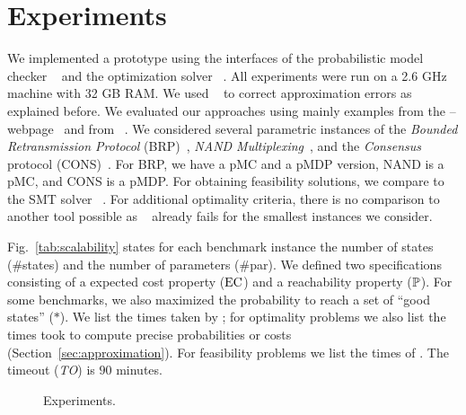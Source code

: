 \section{Experiments}\label{sec:experiments}
%
We implemented a prototype using the  interfaces of the probabilistic model checker ~\cite{DBLP:journals/corr/DehnertJK016} and the optimization solver ~\cite{mosek}.
 All experiments were run on a 2.6 GHz machine with 32 GB RAM. 
 We used ~\cite{KNP11} to correct approximation errors as explained before. 
%
We evaluated our approaches using mainly examples from the --webpage~\cite{param_website} and from ~\cite{KNP12b}.
We considered several parametric instances of the \emph{Bounded Retransmission Protocol} (BRP)~\cite{HSV94},  \emph{NAND Multiplexing}~\cite{HJ02}, and the \emph{Consensus} protocol (CONS)~\cite{consensus}. For BRP, we have a pMC and a pMDP version, NAND is a pMC, and CONS is a pMDP.
For obtaining feasibility solutions, we compare to the SMT solver ~\cite{demoura_nlsat}. For additional optimality criteria, there is no comparison to another tool possible as ~\cite{ipopt} already fails for the smallest instances we consider.

Fig.~\ref{tab:scalability} states for each benchmark instance the number of states (\#{}states) and the number of parameters (\#{}par). We defined two specifications consisting of a expected cost property ($\mathrm{EC}$) and a reachability property ($\mathbb{P}$). For some benchmarks, we also maximized the probability to reach a set of ``good states'' ($*$). We list the times taken by ; for optimality problems we also list the times  took to compute precise probabilities or costs (Section~\ref{sec:approximation}). For feasibility problems we list the times of . The timeout (\emph{TO}) is $90$ minutes.
%
%
\begin{figure}[t]
	\centering
\caption{Experiments.}
\end{figure}


